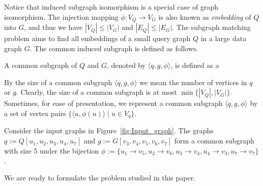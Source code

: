 Notice that  induced subgraph isomorphism is a special case of  graph isomorphism. The injection mapping $\phi: V_Q\rightarrow V_G$ is also known as \emph{embedding} of $Q$ into $G$, {\chengC and thus we have} $|V_Q|\leq |V_G|$ and $|E_Q|\leq |E_G|$. The subgraph matching problem aims to find all embeddings of a small query graph $Q$ in a large data graph $G$. The common induced subgraph is defined as follows. 

\begin{definition}
    \label{def:CIS}
    A common subgraph of $Q$ and $G$, {\cheng denoted by $\langle q,g,\phi \rangle$, is defined as} a   %
\end{definition}

By the size of a common subgraph $\langle q, g,\phi\rangle$ we mean the number of {\YuiR vertices in $q$ or $g$}. %
%
Clearly, the size of a common subgraph is at most $\min\{|V_Q|,|V_G|\}$. 
%
{\YuiR Sometimes, for  ease of presentation, we represent a common subgraph $\langle q,g,\phi \rangle$ by a set of vertex pairs $\{\langle u,\phi(u) \rangle \mid  u\in V_q\}$.}

\begin{example}
Consider the input graphs in Figure~\ref{fig:Input_graph}. The graphs $q := Q[u_1,u_2,u_3,u_4,u_7]$ and  $g := G[v_3,v_4,v_5,v_6,v_7]$ form a common subgraph with size 5 under the bijection $\phi:=\{u_1\!\rightarrow\! v_5,u_2\!\rightarrow\! v_6, u_3\!\rightarrow\! v_4, u_4\!\rightarrow\! v_3, u_7\!\rightarrow\! v_7\}$.%
\end{example}
%
We are ready to formulate the problem studied in this paper.


